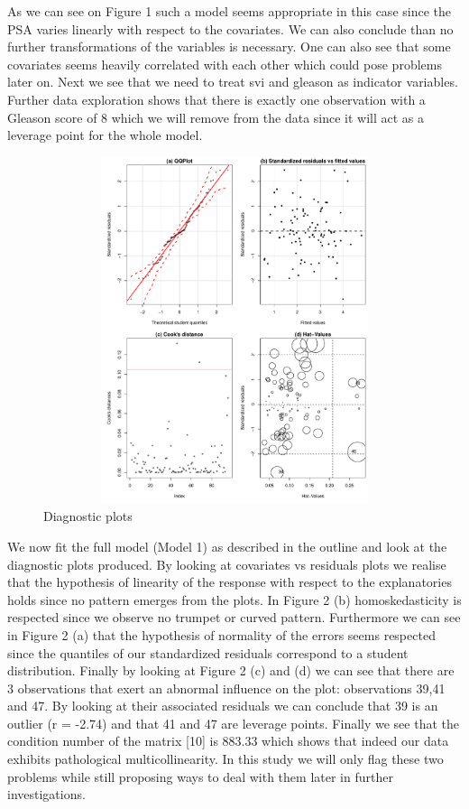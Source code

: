 \documentclass[10pt]{article}
\begin{document}
As we can see on Figure 1 such a model seems appropriate in this case since the PSA varies linearly with respect to the covariates. We can also conclude than no further transformations of the variables is necessary. One can also see that some covariates seems heavily correlated with each other which could pose problems later on. Next we see that we need to treat svi and gleason as indicator variables. Further data exploration shows that there is exactly one observation with a Gleason score of 8 which we will remove from the data since it will act as a leverage point for the whole model.

\begin{figure}[htb]
\begin{center}
\includegraphics[height=4in,width=5in]{diagnostics_full_model.pdf}
\caption{Diagnostic plots}
\end{center}
\end{figure}

We now fit the full model (Model 1) as described in the outline and look at the diagnostic plots produced. By looking at covariates vs residuals plots we realise that the hypothesis of linearity of the response with respect to the explanatories holds since no pattern emerges from the plots. In Figure 2 (b) homoskedasticity  is respected since we observe no trumpet or curved pattern. Furthermore we can see in Figure 2 (a) that the hypothesis of normality of the errors seems respected since the quantiles of our standardized residuals correspond to a student distribution. Finally by looking at Figure 2 (c) and (d) we can see that there are 3 observations that exert an abnormal influence on the plot: observations 39,41 and 47. By looking at their associated residuals we can conclude that 39 is an outlier (r = -2.74) and that 41 and 47 are leverage points. Finally we see that the condition number of the matrix [10] is 883.33 which shows that indeed our data exhibits pathological multicollinearity. In this study we will only flag these two problems while still proposing ways to deal with them later in further investigations.
\end{document}
